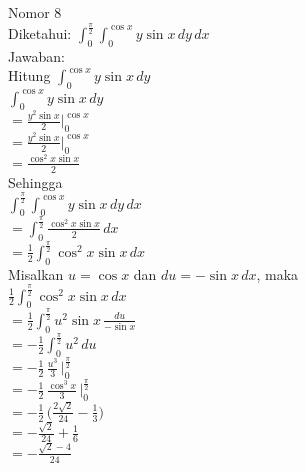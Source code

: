 \documentclass{article}
\begin{document}
    Nomor 8 \\
    Diketahui: \(\int_{0}^{\frac{\pi}{2}}\int_{0}^{\cos x} y \sin x \, dy \, dx\) \\
    Jawaban: \\
    Hitung \( \int_{0}^{\cos x} y \sin x \, dy \) \\
    \(\int_{0}^{\cos x} y \sin x \, dy\) \\
    \(= \frac{y^2 \sin x}{2} \biggr \vert _{0} ^{\cos x}\) \\
    \(= \frac{y^2 \sin x}{2} \biggr \vert _{0} ^{\cos x}\) \\
    \(= \frac{\cos^2 x \sin x}{2}\) \\

    Sehingga \\
    \(\int_{0}^{\frac{\pi}{2}}\int_{0}^{\cos x} y \sin x \, dy \, dx\) \\
    \(= \int_{0}^{\frac{\pi}{2}} \frac{\cos^2 x \sin x}{2} \, dx\) \\
    \(= \frac{1}{2} \int_{0}^{\frac{\pi}{2}} \cos^2 x \sin x \, dx\) \\

    Misalkan \(u = \cos x \) dan \(du = -\sin x \, dx\), maka \\
    \(\frac{1}{2} \int_{0}^{\frac{\pi}{2}} \cos^2 x \sin x \, dx\) \\
    \(= \frac{1}{2} \int_{0}^{\frac{\pi}{2}} u^2 \sin x \, \frac{du}{- \sin x} \) \\
    \(= -\frac{1}{2} \int_{0}^{\frac{\pi}{2}} u^2 \, du \) \\
    \(= -\frac{1}{2} \, \frac{u^3}{3} \, \biggr \vert _0 ^{\frac{\pi}{2}} \) \\
    \(= -\frac{1}{2} \, \frac{\cos^3 x}{3} \, \biggr \vert _0 ^{\frac{\pi}{2}} \) \\
    \(= -\frac{1}{2} \, \biggr(\frac{2 \sqrt 2}{24} - \frac{1}{3} \biggr)\) \\
    \(= -\frac{\sqrt 2}{24} + \frac{1}{6} \) \\
    \(= -\frac{\sqrt 2 - 4}{24}\)
\end{document}
